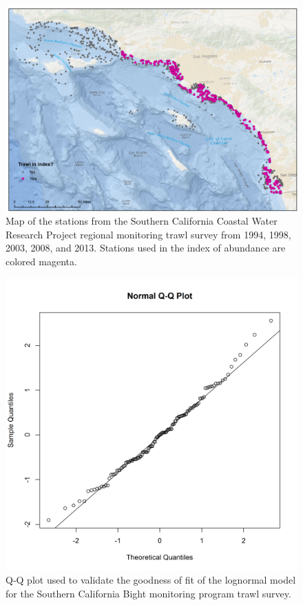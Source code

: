 \documentclass[12pt,]{article}
\begin{document}
\begin{figure}[htbp]
\centering
\includegraphics{Figures/Fleet11_SCBSurvey_map.pdf}
\caption{Map of the stations from the Southern California Coastal Water
Research Project regional monitoring trawl survey from 1994, 1998, 2003,
2008, and 2013. Stations used in the index of abundance are colored
magenta. \label{Fleet11_SCBSurvey_map}}
\end{figure}

\begin{figure}[htbp]
\centering
\includegraphics{Figures/Fleet11_SCBsurvey_QQ.png}
\caption{Q-Q plot used to validate the goodness of fit of the lognormal
model for the Southern California Bight monitoring program trawl survey.
\label{fig:Fleet11_SCBsurvey_QQ}}
\end{figure}
\end{document}
